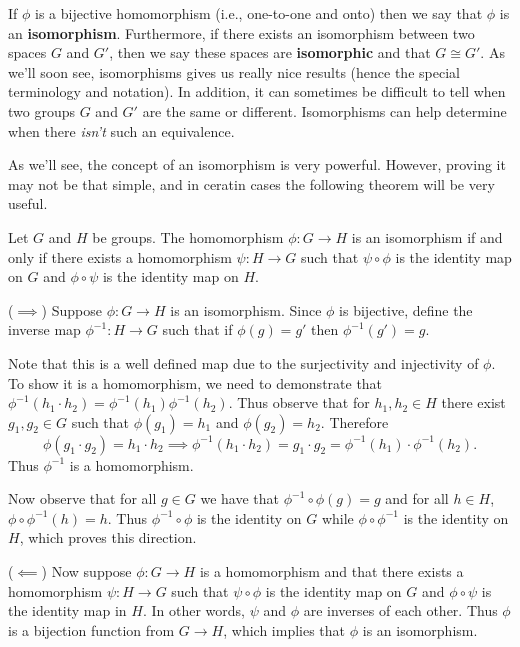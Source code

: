     {\color{Plum} 
    If $\phi$ is a bijective homomorphism (i.e., one-to-one and
    onto) then we say that $\phi$ is an \textbf{isomorphism}.
    Furthermore, if there exists an isomorphism between two spaces
    $G$ and $G'$, then we say these spaces are \textbf{isomorphic}
    and that $G \cong G'$. As we'll soon see, isomorphisms gives
    us really nice results (hence the special terminology and
    notation). In addition, it can sometimes be difficult to tell when
    two groups $G$ and $G'$ are the same or different. Isomorphisms
    can help determine when there \textit{isn't} such an equivalence.

    As we'll see, the concept of an isomorphism is very powerful.
    However, proving it may not be that simple, and in ceratin cases
    the following theorem will be very useful.
    }

    \begin{thm}
        Let $G$ and $H$ be groups. The homomorphism $\phi: G \to H$ is an
        isomorphism if and only if there exists a homomorphism $\psi:
        H \to G$ such that $\psi \circ \phi$ is the identity map on
        $G$ and $\phi \circ \psi$ is the identity map on
        $H$.
    \end{thm}

    \begin{prf}
        ($\implies$) Suppose $\phi: G \to H$ is an isomorphism. Since
        $\phi$ is bijective, define the inverse map $\phi^{-1}: H \to
        G$ such that if $\phi(g) = g'$ then $\phi^{-1}(g') = g$. 

        Note that this is a well defined map due to the surjectivity
        and injectivity of $\phi$. To show it is a homomorphism, we
        need to demonstrate that $\phi^{-1}(h_1\cdot h_2) =
        \phi^{-1}(h_1)\phi^{-1}(h_2)$. Thus 
        observe that for $h_1, h_2 \in H$ there exist $g_1, g_2 \in G$
        such that $\phi(g_1) = h_1$ and $\phi(g_2) = h_2$. Therefore
        \[
            \phi(g_1 \cdot g_2) = h_1 \cdot h_2 \implies \phi^{-1}(h_1 \cdot h_2) = g_1\cdot g_2
            = \phi^{-1}(h_1)\cdot\phi^{-1}(h_2).
        \]
        Thus $\phi^{-1}$ is a homomorphism.

        Now observe that for all $g \in G$ we have that $\phi^{-1}
        \circ \phi(g) = g$ and for all $h \in H$, $\phi \circ \phi^{-1}(h) =
        h.$ Thus $\phi^{-1} \circ \phi$ is the identity on $G$ while
        $\phi \circ \phi^{-1}$ is the identity on $H$, which proves
        this direction.

        ($\impliedby$) Now suppose $\phi: G \to H$ is a homomorphism
        and that there exists a homomorphism
        $\psi: H \to G$ such that $\psi \circ \phi$ is the identity
        map on $G$ and $\phi \circ \psi$ is the identity map in $H$.
        In other words, $\psi$ and $\phi$ are inverses of each other. 
        Thus $\phi$ is a bijection function from $G \to H$, which
        implies that $\phi$ is an isomorphism. 
    \end{prf}
    
